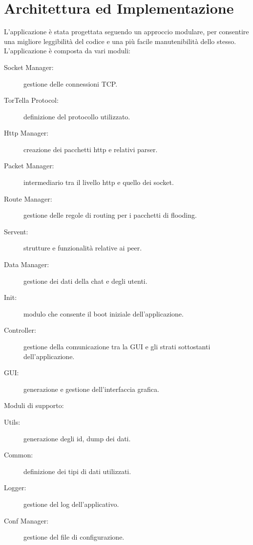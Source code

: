 \chapter{Architettura ed Implementazione}\label{architettura}
L'applicazione è stata progettata seguendo un approccio modulare, per consentire una migliore leggibilità del codice e una più facile manutenibilità dello stesso. L'applicazione è composta da vari moduli:
\begin{description}
\item[Socket Manager:] gestione delle connessioni TCP.
\item[TorTella Protocol:] definizione del protocollo utilizzato.
\item[Http Manager:] creazione dei pacchetti http e relativi parser.
\item[Packet Manager:] intermediario tra il livello http e quello dei socket.
\item[Route Manager:] gestione delle regole di routing per i pacchetti di flooding.
\item[Servent:] strutture e funzionalità relative ai peer.
\item[Data Manager:] gestione dei dati della chat e degli utenti.
\item[Init:] modulo che consente il boot iniziale dell'applicazione.
\item[Controller:] gestione della comunicazione tra la GUI e gli strati sottostanti dell'applicazione.
\item[GUI:] generazione e gestione dell'interfaccia grafica.
\end{description}
Moduli di supporto:
\begin{description}	
\item[Utils:] generazione degli id, dump dei dati. 
\item[Common:] definizione dei tipi di dati utilizzati.
\item[Logger:] gestione del log dell'applicativo.
\item[Conf Manager:] gestione del file di configurazione.
\end{description}
